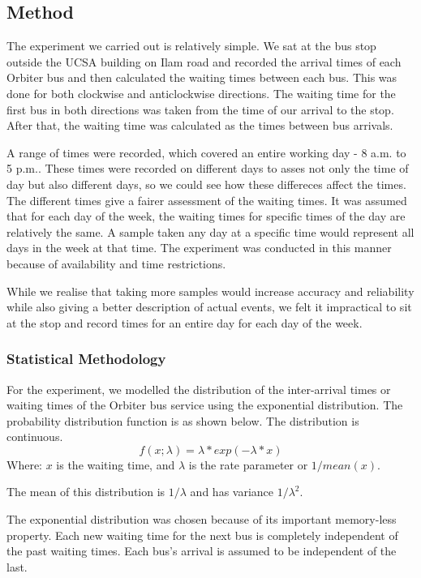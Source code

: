 \subsection{Method}
The experiment we carried out is relatively simple. We sat at the bus stop outside the UCSA building on Ilam road and recorded the arrival times of each Orbiter bus and then calculated the waiting times between each bus. This was done for both clockwise and anticlockwise directions. The waiting time for the first bus in both directions was taken from the time of our arrival to the stop. After that, the waiting time was calculated as the times between bus arrivals.

A range of times were recorded, which covered an entire working day - 8 a.m. to 5 p.m.. These times were recorded on different days to asses not only the time of day but also different days, so we could see how these differeces affect the times. The different times give a fairer assessment of the waiting times. It was assumed that for each day of the week, the waiting times for specific times of the day are relatively the same. A sample taken any day at a specific time would represent all days in the week at that time. The experiment was conducted in this manner because of availability and time restrictions.

While we realise that taking more samples would increase accuracy and reliability while also giving a better description of actual events, we felt it impractical to sit at the stop and record times for an entire day for each day of the week.



\subsubsection*{Statistical Methodology}
For the experiment, we modelled the distribution of the inter-arrival times or waiting times of the Orbiter bus service using the exponential distribution. The probability distribution function is as shown below. The distribution is continuous. $$f(x;\lambda)=\lambda*exp(-\lambda*x)$$
Where: $x$ is the waiting time, and $\lambda$ is the rate parameter or $1/mean(x)$.

The mean of this distribution is $1/\lambda$ and has variance $1/\lambda^2$.

The exponential distribution was chosen because of its important memory-less property. Each new waiting time for the next bus is completely independent of the past waiting times. Each bus's arrival is assumed to be independent of the last.

